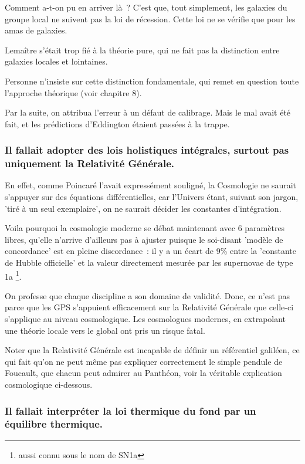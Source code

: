 \documentclass[a4paper,12pt]{article}
\begin{document}
Comment a-t-on pu en arriver là ? C’est que, tout simplement, les galaxies du groupe local ne suivent pas la loi de récession. Cette loi ne se vérifie que pour les amas de galaxies. 


Lemaître s’était trop fié à la théorie pure, qui ne fait pas la distinction entre galaxies locales et lointaines.

Personne n’insiste sur cette distinction fondamentale, qui remet en question toute l’approche théorique (voir chapitre 8). 


Par la suite, on attribua l’erreur à un défaut de calibrage. Mais le mal avait été fait, et les prédictions d’Eddington étaient passées à la trappe.



\subsubsection{Il fallait adopter des lois holistiques intégrales, surtout pas uniquement la Relativité Générale.}
 
En effet, comme Poincaré l'avait expressément souligné, la Cosmologie ne saurait s'appuyer sur des équations différentielles, car l'Univers étant, suivant son jargon, 'tiré à un seul exemplaire', on ne saurait décider les constantes d'intégration. 


Voila pourquoi la cosmologie moderne se débat maintenant avec 6 paramètres libres, qu'elle n'arrive d'ailleurs pas à ajuster puisque le soi-disant 'modèle de concordance' est en pleine discordance : il y a un écart de 9\% entre la 'constante de Hubble officielle' et la valeur directement mesurée par les supernovae de type 1a \footnote{aussi connu sous le nom de SN1a}.


    On professe que chaque discipline a son domaine de validité. Donc, ce n'est pas parce que les GPS s'appuient efficacement sur la Relativité Générale que celle-ci s'applique au niveau cosmologique. Les cosmologues modernes, en extrapolant une théorie locale vers le global ont pris un risque fatal. 

Noter que la Relativité Générale est incapable de définir un référentiel galiléen, ce qui fait qu'on ne peut m\^eme pas expliquer correctement le simple pendule de Foucault, que chacun peut admirer au Panthéon, voir la véritable explication cosmologique ci-dessous.

    
\subsubsection{Il fallait interpréter la loi thermique du fond par un équilibre thermique.}
\end{document}
